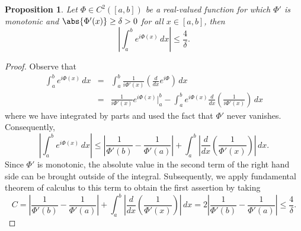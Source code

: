 \documentclass[11pt, letter]{book}
\newtheorem{proposition}[theorem]{Proposition}
\newcommand{\lp}{\left(}
\newcommand{\rp}{\right)}
\newcommand{\f}[2]{\frac{#1}{#2}}
\begin{document}
\begin{framed}
\begin{proposition}\label{prop:NoCriticalPoint}
Let $\Phi\in C^2([a,b])$ be a real-valued function for which $\Phi'$ is monotonic and $\abs{\Phi'(x)} \geq \delta > 0$ for all $x\in [a,b]$, then 
\begin{equation*}
    \left|\int_a^b e^{i\Phi(x)}\,dx\right|\leq \frac{4}{\delta}.
\end{equation*}
\end{proposition}
\end{framed}
\begin{proof}
Observe that
\begin{eqnarray*}
    \int_{a}^b e^{i \Phi(x)}\,dx  
    &=& \int_{a}^b   \f{1}{i \Phi'(x)}\lp \f{d}{dx}e^{i \Phi}\rp   \,dx \\
    &=& \f{1}{i \Phi'(x)}e^{i \Phi(x)}\bigg\vert_{a}^b 
    - \int_{a}^b  e^{i \Phi(x)} \f{d}{dx}\lp \f{1}{i \Phi'(x)} \rp \,dx 
\end{eqnarray*}
where we have integrated by parts and used the fact that $\Phi'$ never vanishes. Consequently,
\begin{equation*}
    \left|\int_a^b e^{i\Phi(x)}\,dx\right|\leq \left|\frac{1}{\Phi'(b)}-\frac{1}{\Phi'(a)}\right|+\int_a^b\left|\frac{d}{dx}\left(\frac{1}{\Phi'(x)}\right)\right|\,dx.
\end{equation*}
Since $\Phi'$ is monotonic, the absolute value in the second term of the right hand side can be brought outside of the integral. Subsequently, we apply fundamental theorem of calculus to this term to obtain the first assertion by taking
\begin{equation*}
 C=\left|\frac{1}{\Phi'(b)}-\frac{1}{\Phi'(a)}\right|+\int_a^b\left|\frac{d}{dx}\left(\frac{1}{\Phi'(x)}\right)\right|\,dx=2\left|\frac{1}{\Phi'(b)}-\frac{1}{\Phi'(a)}\right|\leq\frac{4}{\delta}.
\end{equation*}
\end{proof}
\end{document}
